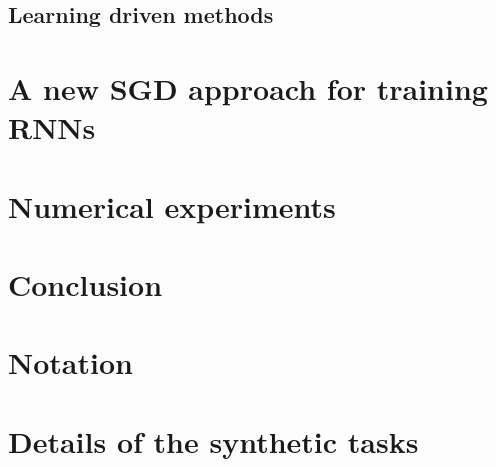 \documentclass[english,laurea,twoside,10pt]{UFtesi}
\theoremstyle{definition}
\theoremstyle{definition}
\theoremstyle{definition}
\begin{document}
  \section{Learning driven methods}
  
  
  
  
  
\chapter{A new SGD approach for training RNNs}
  
\chapter{Numerical experiments}
  \label{ch:experiments}
   
  
  
 \chapter{Conclusion}
 


%   

\appendix
\chapter{Notation}

\chapter{Details of the synthetic tasks}
\label{app:tasks}



\newpage
{}

\end{document}
